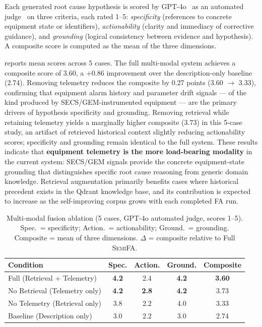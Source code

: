 \documentclass[conference]{IEEEtran}
\newcommand{\semifa}{\textsc{SemiFA}}
\begin{document}
Each generated root cause hypothesis is scored by GPT-4o~\cite{openai2024gpt4o} as an automated judge~\cite{zheng2023judging} on three criteria, each rated 1--5: \textit{specificity} (references to concrete equipment state or identifiers), \textit{actionability} (clarity and immediacy of corrective guidance), and \textit{grounding} (logical consistency between evidence and hypothesis).
A composite score is computed as the mean of the three dimensions.

 reports mean scores across 5 cases.
The full multi-modal system achieves a composite score of 3.60, a $+$0.86 improvement over the description-only baseline (2.74).
Removing telemetry reduces the composite by 0.27 points (3.60 $\rightarrow$ 3.33), confirming that equipment alarm history and parameter drift signals --- of the kind produced by SECS/GEM-instrumented equipment --- are the primary drivers of hypothesis specificity and grounding.
Removing retrieval while retaining telemetry yields a marginally higher composite (3.73) in this 5-case study, an artifact of retrieved historical context slightly reducing actionability scores; specificity and grounding remain identical to the full system.
These results indicate that \textbf{equipment telemetry is the more load-bearing modality} in the current system: SECS/GEM signals provide the concrete equipment-state grounding that distinguishes specific root cause reasoning from generic domain knowledge.
Retrieval augmentation primarily benefits cases where historical precedent exists in the Qdrant knowledge base, and its contribution is expected to increase as the self-improving corpus grows with each completed FA run.

\begin{table}[t]
    \centering
    \caption{Multi-modal fusion ablation (5 cases, GPT-4o automated judge, scores 1--5).
    Spec.\ = specificity; Action.\ = actionability; Ground.\ = grounding.
    Composite = mean of three dimensions.
    $\Delta$ = composite relative to Full \semifa{}.}
    \label{tab:retrieval_ablation}
    \begin{tabular}{@{}lcccc@{}}
        \toprule
        \textbf{Condition} & \textbf{Spec.} & \textbf{Action.} & \textbf{Ground.} & \textbf{Composite} \\
        \midrule
        Full (Retrieval + Telemetry) & \textbf{4.2} & 2.4 & \textbf{4.2} & \textbf{3.60} \\
        No Retrieval (Telemetry only) & \textbf{4.2} & \textbf{2.8} & \textbf{4.2} & 3.73 \\
        No Telemetry (Retrieval only) & 3.8 & 2.2 & 4.0 & 3.33 \\
        Baseline (Description only) & 3.0 & 2.2 & 3.0 & 2.74 \\
        \bottomrule
    \end{tabular}
\end{table}
\end{document}
